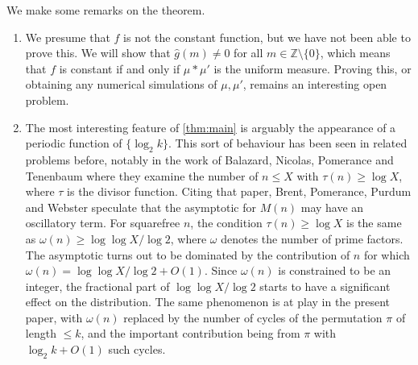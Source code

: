\documentclass[11pt,reqno]{amsart}
\numberwithin{equation}{section}
\theoremstyle{definition}
\theoremstyle{remark}
\newcommand{\wh}{\widehat}
\renewcommand{\le}{\leqslant}
\renewcommand{\ge}{\geqslant}
\newcommand\Z{\mathbb{Z}}
\begin{document}
We make some remarks on the theorem.

\begin{enumerate} \item
 We presume that $f$ is not the constant function, but we have not been able to prove this. We will show that $\wh{g}(m) \ne 0$ for all $m \in \Z \setminus \{0\}$, which means that $f$ is constant if and only if $\mu \ast \mu'$ is the uniform measure. Proving this, or obtaining any numerical simulations of $\mu, \mu'$, remains an interesting open problem.

\item  The most interesting feature of \cref{thm:main} is arguably the appearance of a periodic function of $\{\log_2 k\}$. This sort of behaviour has been seen in related problems before, notably in the work of Balazard, Nicolas, Pomerance and Tenenbaum \cite{bnpt} where they examine the number of $n \le X$ with $\tau(n) \ge \log X$, where $\tau$ is the divisor function. Citing that paper, Brent, Pomerance, Purdum and Webster \cite{bppw} speculate that the asymptotic for $M(n)$ may have an oscillatory term.
For squarefree $n$, the condition $\tau(n) \ge \log X$ is the same as $\omega(n) \ge \log \log X/\log 2$, where $\omega$ denotes the number of prime factors. The asymptotic turns out to be dominated by the contribution of $n$ for which $\omega(n) = \log \log X/\log 2 + O(1)$. Since $\omega(n)$ is constrained to be an integer, the fractional part of $\log \log X/\log 2$ starts to have a significant effect on the distribution. The same phenomenon is at play in the present paper, with $\omega(n)$ replaced by the number of cycles of the permutation $\pi$ of length $\le k$, and the important contribution being from $\pi$ with $\log_2 k + O(1)$ such cycles.


\end{enumerate}
\end{document}
